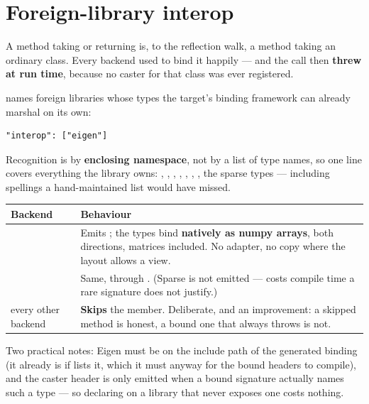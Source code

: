 \section{Foreign-library interop}
\label{sec:interop}

A method taking or returning  is, to the reflection walk,
a method taking an ordinary class. Every backend used to bind it happily --- and
the call then \textbf{threw at run time}, because no caster for that class was
ever registered.

 names foreign libraries whose types the target's binding
framework can already marshal on its own:

\begin{lstlisting}[style=json]
"interop": ["eigen"]
\end{lstlisting}

Recognition is by \textbf{enclosing namespace}, not by a list of type names, so
one line covers everything the library owns: , ,
, , , , , the sparse
types --- including spellings a hand-maintained list would have missed.

\begin{center}
\small
\begin{tabular}{@{}lL{9.4cm}@{}}
\toprule
\textbf{Backend} & \textbf{Behaviour} \\
\midrule
{} & Emits ; the types bind
  \textbf{natively as numpy arrays}, both directions, matrices included. No
  adapter, no copy where the layout allows a view. \\
\addlinespace
{} & Same, through . (Sparse is not
  emitted ---  costs compile time a rare
  signature does not justify.) \\
\addlinespace
every other backend & \textbf{Skips} the member. Deliberate, and an improvement:
  a skipped method is honest, a bound one that always throws is not. \\
\bottomrule
\end{tabular}
\end{center}

Two practical notes: Eigen must be on the include path of the generated binding
(it already is if  lists it, which it must anyway for the
bound headers to compile), and the caster header is only emitted when a bound
signature actually names such a type --- so declaring  on a
library that never exposes one costs nothing.


